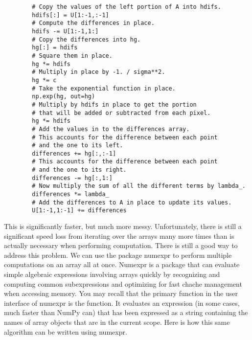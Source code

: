 \begin{lstlisting}
        # Copy the values of the left portion of A into hdifs.
        hdifs[:] = U[1:-1,:-1]
        # Compute the differences in place.
        hdifs -= U[1:-1,1:]
        # Copy the differences into hg.
        hg[:] = hdifs
        # Square them in place.
        hg *= hdifs
        # Multiply in place by -1. / sigma**2.
        hg *= c
        # Take the exponential function in place.
        np.exp(hg, out=hg)
        # Multiply by hdifs in place to get the portion
        # that will be added or subtracted from each pixel.
        hg *= hdifs
        # Add the values in to the differences array.
        # This accounts for the difference between each point
        # and the one to its left.
        differences += hg[:,:-1]
        # This accounts for the difference between each point
        # and the one to its right.
        differences -= hg[:,1:]
        # Now multiply the sum of all the different terms by lambda_.
        differences *= lambda_
        # Add the differences to A in place to update its values.
        U[1:-1,1:-1] += differences
\end{lstlisting}
This is significantly faster, but much more messy.
Unfortunately, there is still a significant speed loss from iterating over the arrays many more times than is actually necessary when performing computation.
There is still a good way to address this problem.
We can use the package numexpr to perform multiple computations on an array all at once.
Numexpr is a package that can evaluate simple algebraic expressions involving arrays quickly by recognizing and computing common subexpressions and optimizing for fast chache management when accessing memory.
You may recall that the primary function in the user interface of numexpr is the  function.
It evaluates an expression (in some cases, much faster than NumPy can) that has been expressed as a string containing the names of array objects that are in the current scope.
Here is how this same algorithm can be written using numexpr.
